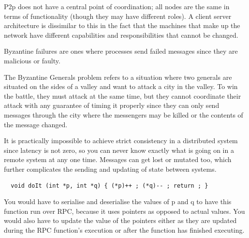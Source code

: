 
P2p does not have a central point of coordination; all nodes are the same in
terms of functionality (though they may have different roles). A client server
architecture is dissimilar to this in the fact that the machines that make up
the network have different capabilities and responsibilities that cannot be
changed.


Byzantine failures are ones where processes send failed messages since they are
malicious or faulty.

The Byzantine Generals problem refers to a situation where two generals  are
situated on the sides of a valley and want to attack a city in the valley. To
win the battle, they must attack at the same time, but they cannot coordinate
their attack with any guarantee of timing it properly since they can only send
messages through the city where the messengers may be killed or the contents of
the message changed.




It is practically impossible to achieve strict consistency in a distributed
system since latency is not zero, so you can never know exactly what is going on
in a remote system at any one time. Messages can get lost or mutated too, which
further complicates the sending and updating of state between systems.


\begin{verbatim}
  void doIt (int *p, int *q) { (*p)++ ; (*q)-- ; return ; }
\end{verbatim}

You would have to serialise and deserialise the values of p and q to have this
function run over RPC, because it uses pointers as opposed to actual values. You
would also have to update the value of the pointers either as they are updated
during the RPC function’s execution or after the function has finished
executing.

